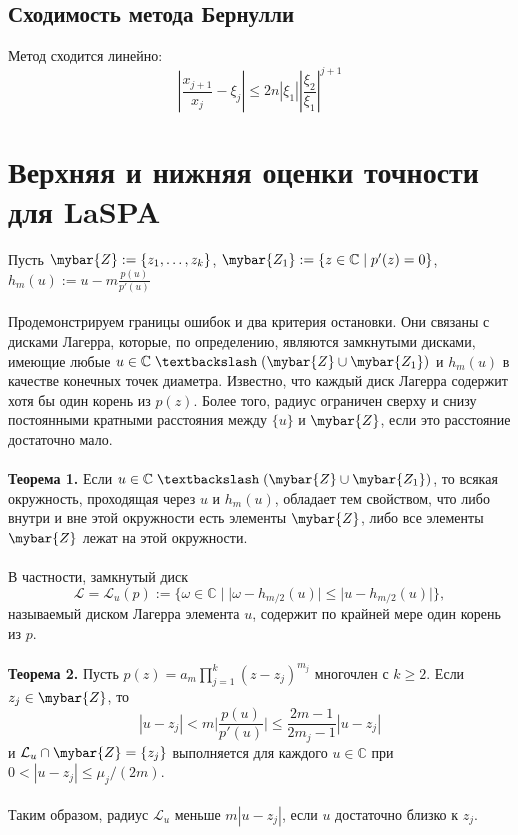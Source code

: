 \documentclass[a4paper,12pt]{article}
\begin{document}
\subsection{Сходимость метода Бернулли}
Метод сходится линейно: %
\begin{equation}
    |\frac{x_{j+1}}{x_j}-\xi_j| \leq 2n|\xi_1||\frac{\xi_2}{\xi_1}|^{j+1}
\end{equation}

        
\newpage
\section{Верхняя и нижняя оценки точности для LaSPA}
Пусть $\mybar{Z}:=\{z_1, \dots, z_k\}$, $\mybar{Z_1}:=\{z\in \mathbb{C} \; | \; p'(z)=0\}$, $h_m(u):=u-m\frac{p(u)}{p'(u)}$
\\\\
Продемонстрируем границы ошибок и два критерия остановки. Они связаны с дисками Лагерра, которые, по определению, являются замкнутыми дисками, имеющие любые $u\in \mathbb{C} \; \textbackslash \;(\mybar{Z}\cup \mybar{Z_1})$ и $h_m(u)$ в качестве конечных точек диаметра. Известно, что каждый диск Лагерра содержит хотя бы один корень из $p(z)$. Более того, радиус ограничен сверху и снизу постоянными кратными расстояния между $\{u\}$ и $\mybar{Z}$, если это расстояние достаточно мало.
\\\\
\textbf{Теорема 1.} Если $u\in \mathbb{C} \; \textbackslash \;(\mybar{Z}\cup \mybar{Z_1})$, то всякая окружность, проходящая через $u$ и $h_m(u)$, обладает тем свойством, что либо внутри и вне этой окружности есть элементы $\mybar{Z}$, либо все элементы $\mybar{Z}$ лежат на этой окружности.
\\\\
В частности, замкнутый диск
\[\mathcal{L}=\mathcal{L}_u(p) :=\{\omega \in \mathbb{C} \; | \; |\omega-h_{m/2}(u)|\leq |u-h_{m/2}(u)| \},\]
называемый диском Лагерра элемента $u$, содержит по крайней мере один корень из $p$.
\\\\
\textbf{Теорема 2.} Пусть $p(z) = a_m\prod_{j=1}^{k}(z-z_j)^{m_j}$ многочлен с $k\geq2$. Если $z_j\in \mybar{Z}$, то 
\[|u-z_j|<m \bigg|{\frac{p(u)}{p'(u)}}\bigg |\leq \frac{2m-1}{2m_j-1}|u-z_j|\]
и $\mathcal{L}_u \cap \mybar{Z} = \{z_j\}$ выполняется для каждого $u \in \mathbb{C}$ при $0<|u-z_j|\leq \mu_j/(2m).$ 
\\\\
Таким образом, радиус $\mathcal{L}_u$ меньше $m|u-z_j|$, если $u$ достаточно близко к $z_j$.
\newpage
\end{document}
